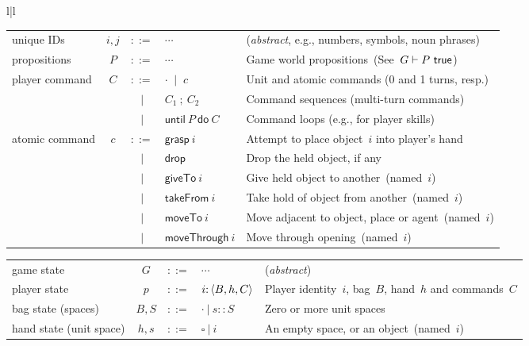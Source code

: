 \begin{figure*}
\small

\begin{tabular}{l|l}

\begin{minipage}{0.68\textwidth}
\begin{tabular}{lccll}
unique IDs & $i,j$ & $::=$ & $\cdots$ & (\emph{abstract}, e.g., numbers, symbols, noun phrases)
\\
propositions   & $P$ & $::=$ & $\cdots$ & Game world propositions~(See~$G \vdash P~\textsf{true}$)
\\
player command & $C$ & $::=$ & $\cdot$ $~|~$ $c$ & Unit and atomic commands (0 and 1 turns, resp.)
\\
               &     & $~|~$ & $C_1~{;}~C_2$ & Command sequences (multi-turn commands)
\\
               &     & $~|~$ & $\textsf{until}~P~\textsf{do}~C$ & Command loops (e.g., for player skills)
\\
atomic command & $c$ & $::=$ & $\textsf{grasp}~i$ & Attempt to place object~$i$ into player's hand
\\
               &     & $|$   & $\textsf{drop}$ & Drop the held object, if any
\\
               &     & $|$   & $\textsf{giveTo}~i$ & Give held object to another~(named~$i$)
\\
               &     & $|$   & $\textsf{takeFrom}~i$ & Take hold of object from another~(named~$i$)
\\
               &     & $|$   & $\textsf{moveTo}~i$ & Move adjacent to object, place or agent~(named~$i$)
\\
               &     & $|$   & $\textsf{moveThrough}~i$ & Move through opening~(named~$i$)
\\[5mm]
\end{tabular}
\begin{tabular}{lccll}
game state & $G$ & $::=$ & $\cdots$ & (\emph{abstract})
\\
player state & $p$ & $::=$ & ${i}{:}\left<{B},{h},{C}\right>$ & Player identity~$i$, bag~$B$, hand~$h$ and commands~$C$
\\
bag state (spaces) & $B,S$ & $::=$ & $\cdot~|~s::S$ & Zero or more unit spaces
\\
hand state (unit space) & $h,s$ & $::=$ & $\square~|~i$ & An empty space, or an object~(named~$i$)
\\
\end{tabular}
\end{minipage}


\end{tabular}
\end{figure*}
